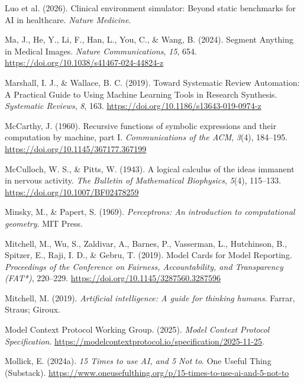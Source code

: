 \documentclass[
  letterpaper,
  11pt]{scrbook}
\newlength{\cslhangindent}
\newenvironment{CSLReferences}[2] %
 {\begin{list}{}{%
  \setlength{\itemindent}{0pt}
  \setlength{\leftmargin}{0pt}
  \setlength{\parsep}{0pt}
  \ifodd #1
   \setlength{\leftmargin}{\cslhangindent}
   \setlength{\itemindent}{-1\cslhangindent}
  \fi
  \setlength{\itemsep}{#2\baselineskip}}}
 {\end{list}}
\begin{document}
\begin{CSLReferences}{1}{0}
{Luo et al.} (2026). Clinical environment simulator: Beyond static
benchmarks for {AI} in healthcare. \emph{Nature Medicine}.

Ma, J., He, Y., Li, F., Han, L., You, C., \& Wang, B. (2024). {Segment
Anything in Medical Images}. \emph{Nature Communications}, \emph{15},
654. \url{https://doi.org/10.1038/s41467-024-44824-z}

Marshall, I. J., \& Wallace, B. C. (2019). {Toward Systematic Review
Automation}: {A Practical Guide to Using Machine Learning Tools in
Research Synthesis}. \emph{Systematic Reviews}, \emph{8}, 163.
\url{https://doi.org/10.1186/s13643-019-0974-z}

McCarthy, J. (1960). Recursive functions of symbolic expressions and
their computation by machine, part {I}. \emph{Communications of the
ACM}, \emph{3}(4), 184--195. \url{https://doi.org/10.1145/367177.367199}

McCulloch, W. S., \& Pitts, W. (1943). A logical calculus of the ideas
immanent in nervous activity. \emph{The Bulletin of Mathematical
Biophysics}, \emph{5}(4), 115--133.
\url{https://doi.org/10.1007/BF02478259}

Minsky, M., \& Papert, S. (1969). \emph{Perceptrons: An introduction to
computational geometry}. MIT Press.

Mitchell, M., Wu, S., Zaldivar, A., Barnes, P., Vasserman, L.,
Hutchinson, B., Spitzer, E., Raji, I. D., \& Gebru, T. (2019). {Model
Cards for Model Reporting}. \emph{Proceedings of the Conference on
Fairness, Accountability, and Transparency (FAT*)}, 220--229.
\url{https://doi.org/10.1145/3287560.3287596}

Mitchell, M. (2019). \emph{Artificial intelligence: A guide for thinking
humans}. Farrar, Straus; Giroux.

Model Context Protocol Working Group. (2025). \emph{{Model Context
Protocol Specification}}.
\url{https://modelcontextprotocol.io/specification/2025-11-25}.

Mollick, E. (2024a). \emph{{15 Times to use AI, and 5 Not to}}. One
Useful Thing (Substack).
\url{https://www.oneusefulthing.org/p/15-times-to-use-ai-and-5-not-to}


\end{CSLReferences}
\end{document}

